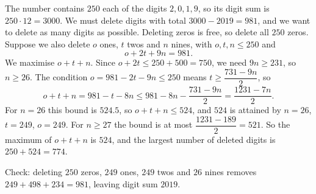 The number contains $250$ each of the digits $2,0,1,9$, so its digit sum is $250\cdot12=3000$. We must delete digits with total $3000-2019=981$, and we want to delete as many digits as possible. Deleting zeros is free, so delete all $250$ zeros. Suppose we also delete $o$ ones, $t$ twos and $n$ nines, with $o,t,n\le250$ and
\[
o+2t+9n=981 .
\]
We maximise $o+t+n$. Since $o+2t\le250+500=750$, we need $9n\ge231$, so $n\ge26$. The condition $o=981-2t-9n\le250$ means $t\ge\dfrac{731-9n}{2}$, so
\[
o+t+n=981-t-8n\le981-8n-\dfrac{731-9n}{2}=\dfrac{1231-7n}{2}.
\]
For $n=26$ this bound is $524.5$, so $o+t+n\le524$, and $524$ is attained by $n=26$, $t=249$, $o=249$. For $n\ge27$ the bound is at most $\dfrac{1231-189}{2}=521$. So the maximum of $o+t+n$ is $524$, and the largest number of deleted digits is $250+524=\boxed{774}$.

Check: deleting $250$ zeros, $249$ ones, $249$ twos and $26$ nines removes $249+498+234=981$, leaving digit sum $2019$.
